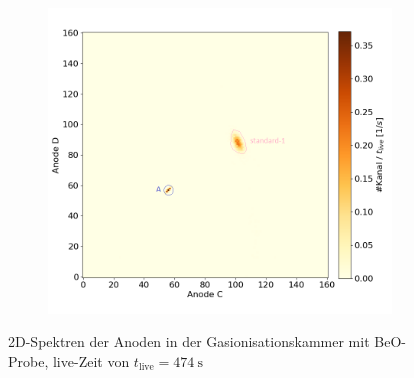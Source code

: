 \begin{figure}[H]
\begin{subfigure}{0.47\textwidth}
    \end{subfigure}
    \begin{subfigure}{0.47\textwidth}
        \centering
        \includegraphics[width=\linewidth]{Pictures/Gasdetektor/22_standard_CD.png}
    \end{subfigure}
    \caption{2D-Spektren der Anoden in der Gasionisationskammer mit BeO-Probe, live-Zeit von $t_{\text{live}} = \SI{474}{\second}$}
    \label{Auswertung_Gasdetektor_2DSpektren_BeO}
\end{figure}
